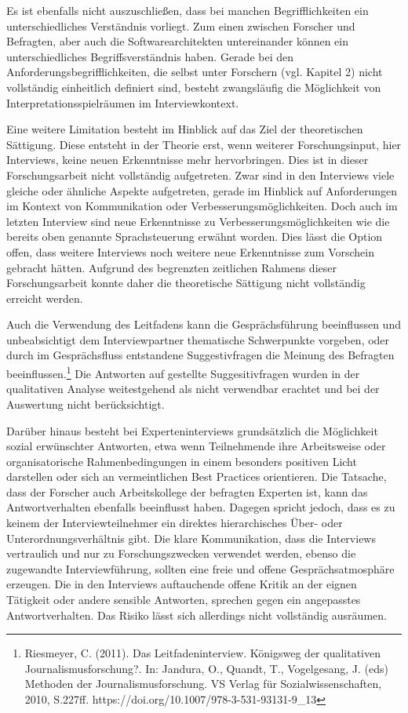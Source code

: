 Es ist ebenfalls nicht auszuschließen, dass bei manchen Begrifflichkeiten ein unterschiedliches Verständnis vorliegt. Zum einen zwischen Forscher und Befragten, aber auch die Softwarearchitekten untereinander können ein unterschiedliches Begriffsverständnis haben. Gerade bei den Anforderungsbegrifflichkeiten, die selbst unter Forschern (vgl. Kapitel 2) nicht vollständig einheitlich definiert sind, besteht zwangsläufig die Möglichkeit von Interpretationsspielräumen im Interviewkontext.

Eine weitere Limitation besteht im Hinblick auf das Ziel der theoretischen Sättigung. Diese entsteht in der Theorie erst, wenn weiterer Forschungsinput, hier Interviews, keine neuen Erkenntnisse mehr hervorbringen.  Dies ist in dieser Forschungsarbeit nicht vollständig aufgetreten. Zwar sind in den Interviews viele gleiche oder ähnliche Aspekte aufgetreten, gerade im Hinblick auf Anforderungen im Kontext von Kommunikation oder Verbesserungsmöglichkeiten. Doch auch im letzten Interview sind neue Erkenntnisse zu Verbesserungsmöglichkeiten wie die bereits oben genannte Sprachsteuerung erwähnt worden. Dies lässt die Option offen, dass weitere Interviews noch weitere neue Erkenntnisse zum Vorschein gebracht hätten. Aufgrund des begrenzten zeitlichen Rahmens dieser Forschungsarbeit konnte daher die theoretische Sättigung nicht vollständig erreicht werden. 

Auch die Verwendung des Leitfadens kann die Gesprächsführung beeinflussen und unbeabsichtigt dem Interviewpartner thematische Schwerpunkte vorgeben, oder durch im Gesprächsfluss entstandene Suggestivfragen die Meinung des Befragten beeinflussen.\footnote{Riesmeyer, C. (2011). Das Leitfadeninterview. Königsweg der qualitativen Journalismusforschung?. In: Jandura, O., Quandt, T., Vogelgesang, J. (eds) Methoden der Journalismusforschung. VS Verlag für Sozialwissenschaften, 2010, S.227ff.  https://doi.org/10.1007/978-3-531-93131-9_13} Die Antworten auf gestellte Suggesitivfragen wurden in der qualitativen Analyse weitestgehend als nicht verwendbar erachtet und bei der Auswertung nicht berücksichtigt.

Darüber hinaus besteht bei Experteninterviews grundsätzlich die Möglichkeit sozial erwünschter Antworten, etwa wenn Teilnehmende ihre Arbeitsweise oder organisatorische Rahmenbedingungen in einem besonders positiven Licht darstellen oder sich an vermeintlichen Best Practices orientieren. Die Tatsache, dass der Forscher auch Arbeitskollege der befragten Experten ist, kann das Antwortverhalten ebenfalls beeinflusst haben. Dagegen spricht jedoch, dass es zu keinem der Interviewteilnehmer ein direktes hierarchisches Über- oder Unterordnungsverhältnis gibt. Die klare Kommunikation, dass die Interviews vertraulich und nur zu Forschungszwecken verwendet werden, ebenso die zugewandte Interviewführung, sollten eine freie und offene Gesprächsatmosphäre erzeugen. Die in den Interviews auftauchende offene Kritik an der eignen Tätigkeit oder andere sensible Antworten, sprechen gegen ein angepasstes Antwortverhalten. Das Risiko lässt sich allerdings nicht vollständig ausräumen.

